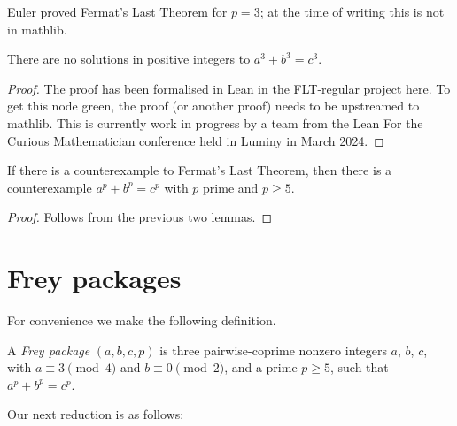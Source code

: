 Euler proved Fermat's Last Theorem for $p=3$; at the time of writing this is not in mathlib.

\begin{lemma}\label{fermatLastTheoremThree}\leanok
{}
  There are no solutions in positive integers to $a^3+b^3=c^3$.
\end{lemma}
\begin{proof}
  The proof has been formalised in Lean in the FLT-regular project \href{https://github.com/leanprover-community/flt-regular/blob/861b7df057140b45b8bb7d30d33426ffbbdda52b/FltRegular/FltThree/FltThree.lean#L698}{\underline{here}}. To get this node green, the proof (or another proof) needs to be upstreamed to mathlib. This is currently work in progress by a team from the Lean For the Curious Mathematician conference held in Luminy in March 2024.
\end{proof}

\begin{corollary}\label{FLT.p_ge_5_counterexample_of_not_FermatLastTheorem}\leanok If there is a counterexample to Fermat's Last Theorem, then there is a counterexample $a^p+b^p=c^p$ with $p$ prime and $p\geq 5$.
\end{corollary}
\begin{proof}\leanok Follows from the previous two lemmas.\end{proof}

\section{Frey packages}

For convenience we make the following definition.

\begin{definition}\label{FLT.FreyPackage}\leanok A \emph{Frey package} $(a,b,c,p)$ is three pairwise-coprime nonzero integers $a$, $b$, $c$, with $a\equiv3\pmod4$ and $b\equiv0\pmod2$, and a prime $p\geq5$, such that $a^p+b^p=c^p$.\end{definition}

Our next reduction is as follows:

